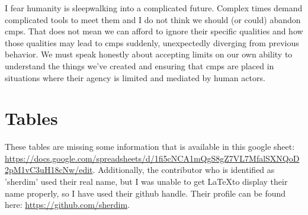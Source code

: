 \documentclass[a4paper,man,natbib,floatsintext]{apa6}
\begin{document}
  I fear humanity is sleepwalking into a complicated future. Complex times demand complicated tools to meet them and I do not think we should (or could) abandon \glspl{cmp}. That does not mean we can afford to ignore their specific qualities and how those qualities may lead to \glspl{cmp} suddenly, unexpectedly diverging from previous behavior. We must speak honestly about accepting limits on our own ability to understand the things we've created and ensuring that \glspl{cmp} are placed in situations where their agency is limited and mediated by human actors. 
  

   \singlespacing
   \printnoidxglossaries


   \section{Tables}
   These tables are missing some information that is available in this google sheet: \url{https://docs.google.com/spreadsheets/d/1fi5cNCA1mQgS8gZ7VL7MfalSXNQoD2pM1vC3uH18cNw/edit}. Additionally, the contributor who is identified as 'sherdim' used their real name, but I was unable to get \LaTeX to display their name properly, so I have used their github handle. Their profile can be found here: \url{https://github.com/sherdim}.
\end{document}
